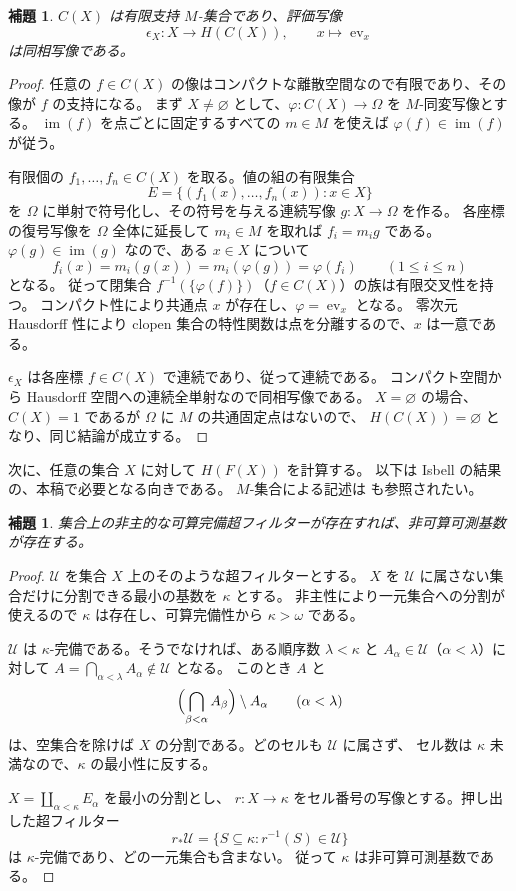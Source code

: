 \documentclass[a4paper,11pt]{ltjsarticle}
\theoremstyle{japaneseplain}
\newtheorem{lemma}[theorem]{補題}
\newcommand{\ev}{\operatorname{ev}}
\newcommand{\im}{\operatorname{im}}
\begin{document}
\begin{lemma}\label{lem:compactevaluation}
$C(X)$ は有限支持 $M$-集合であり、評価写像
\begin{equation}\label{eq:compactevaluation}
 \epsilon_X:X\longrightarrow H(C(X)),\qquad
 x\longmapsto\ev_x
\end{equation}
は同相写像である。
\end{lemma}
\begin{proof}
任意の $f\in C(X)$ の像はコンパクトな離散空間なので有限であり、その像が $f$ の支持になる。
まず $X\ne\varnothing$ として、$\varphi:C(X)\to\Omega$ を $M$-同変写像とする。
$\im(f)$ を点ごとに固定するすべての $m\in M$ を使えば
$\varphi(f)\in\im(f)$ が従う。

有限個の $f_1,\ldots,f_n\in C(X)$ を取る。値の組の有限集合
\[
 E=\{(f_1(x),\ldots,f_n(x)):x\in X\}
\]
を $\Omega$ に単射で符号化し、その符号を与える連続写像 $g:X\to\Omega$ を作る。
各座標の復号写像を $\Omega$ 全体に延長して $m_i\in M$ を取れば $f_i=m_i g$ である。
$\varphi(g)\in\im(g)$ なので、ある $x\in X$ について
\[
 f_i(x)=m_i(g(x))=m_i(\varphi(g))=\varphi(f_i)
 \qquad(1\le i\le n)
\]
となる。
従って閉集合 $f^{-1}(\{\varphi(f)\})$（$f\in C(X)$）の族は有限交叉性を持つ。
コンパクト性により共通点 $x$ が存在し、$\varphi=\ev_x$ となる。
零次元 Hausdorff 性により clopen 集合の特性関数は点を分離するので、$x$ は一意である。

$\epsilon_X$ は各座標 $f\in C(X)$ で連続であり、従って連続である。
コンパクト空間から Hausdorff 空間への連続全単射なので同相写像である。
$X=\varnothing$ の場合、$C(X)=1$ であるが $\Omega$ に $M$ の共通固定点はないので、
$H(C(X))=\varnothing$ となり、同じ結論が成立する。
\end{proof}

次に、任意の集合 $X$ に対して $H(F(X))$ を計算する。
以下は Isbell の結果 \cite[\S2.5]{Isbell60} の、本稿で必要となる向きである。
$M$-集合による記述は \cite[p.~20]{Shulman08} も参照されたい。

\begin{lemma}\label{lem:ultrafilter}
集合上の非主的な可算完備超フィルターが存在すれば、非可算可測基数が存在する。
\end{lemma}
\begin{proof}
$\mathscr U$ を集合 $X$ 上のそのような超フィルターとする。
$X$ を $\mathscr U$ に属さない集合だけに分割できる最小の基数を $\kappa$ とする。
非主性により一元集合への分割が使えるので $\kappa$ は存在し、可算完備性から $\kappa>\omega$ である。

$\mathscr U$ は $\kappa$-完備である。そうでなければ、ある順序数 $\lambda<\kappa$ と
$A_\alpha\in\mathscr U$（$\alpha<\lambda$）に対して
$A=\bigcap_{\alpha<\lambda}A_\alpha\notin\mathscr U$ となる。
このとき $A$ と
\[
 \Bigl(\bigcap_{\beta<\alpha}A_\beta\Bigr)\setminus A_\alpha
 \qquad(\alpha<\lambda)
\]
は、空集合を除けば $X$ の分割である。どのセルも $\mathscr U$ に属さず、
セル数は $\kappa$ 未満なので、$\kappa$ の最小性に反する。

$X=\coprod_{\alpha<\kappa}E_\alpha$ を最小の分割とし、
$r:X\to\kappa$ をセル番号の写像とする。押し出した超フィルター
\[
 r_*\mathscr U=\{S\subseteq\kappa:r^{-1}(S)\in\mathscr U\}
\]
は $\kappa$-完備であり、どの一元集合も含まない。
従って $\kappa$ は非可算可測基数である。
\end{proof}
\end{document}

